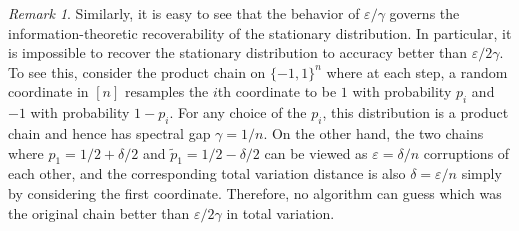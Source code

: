 \documentclass[11pt]{article}
\theoremstyle{remark}
\newtheorem{rmk}{Remark}[section]
\begin{document}
\begin{rmk}
\label{rmk:gap}
    Similarly, it is easy to see that the behavior of $\varepsilon/\gamma$ governs the information-theoretic recoverability of the stationary distribution. In particular, it is impossible to recover the stationary distribution to accuracy better than $\varepsilon/2\gamma$. To see this, consider the product chain on $\{-1,1\}^n$ where at each step, a random coordinate in $[n]$ resamples the $i$th coordinate to be $1$ with probability $p_i$ and $-1$ with probability $1-p_i$. For any choice of the $p_i$, this distribution is a product chain and hence has spectral gap $\gamma=1/n$. On the other hand, the two chains where $p_1=1/2+\delta/2$ and $\widetilde{p}_1=1/2-\delta/2$ can be viewed as $\varepsilon=\delta/n$ corruptions of each other, and the corresponding total variation distance is also $\delta=\varepsilon/n$ simply by considering the first coordinate. Therefore, no algorithm can guess which was the original chain better than $\varepsilon/2\gamma$ in total variation.
\end{rmk}
\end{document}
